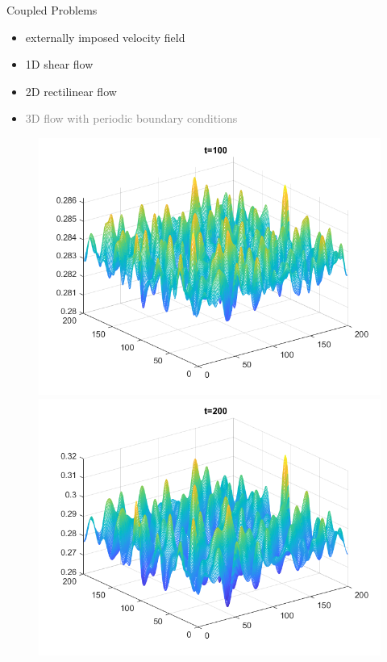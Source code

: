 
\begin{frame}{Coupled Problems}
	\begin{itemize}
		\item externally imposed velocity field \checkmark
		\item 1D shear flow \checkmark
		\item 2D rectilinear flow \checkmark
		\item \textcolor{gray}{3D flow with periodic boundary conditions}
	\end{itemize}
\end{frame}

\begin{frame}
	\scriptsize
	\begin{figure}[H]
		\begin{minipage}{0.4\textwidth}
			\centering
			\includegraphics[scale=0.25]{Bilder_wxwy/2nd_t=100_mx=my=200_random_Dr=1_(1.d0+(1.d-2rand(0)-5.d-4))Divide(2.d0dsqrt(pi))}
		\end{minipage}
		\hfill 
		\begin{minipage}{0.4\textwidth}
			\centering
			\includegraphics[scale=0.25]{Bilder_wxwy/2nd_t=200_mx=my=200_random_Dr=1_(1.d0+(1.d-2rand(0)-5.d-4))Divide(2.d0dsqrt(pi))}
		\end{minipage}
		

\end{figure}
\end{frame}
